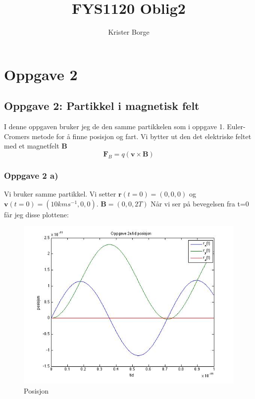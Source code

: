 \documentclass[12pt,a4paper,final,leqno]{report}
\author{Krister Borge }
\title{FYS1120 Oblig2}
\begin{document}
\maketitle

\newpage
\chapter*{Oppgave 2}
\section*{Oppgave 2: Partikkel i magnetisk felt}

I denne oppgaven bruker jeg de den samme partikkelen som i oppgave 1. Euler-Cromers metode for å finne posisjon og fart. Vi bytter ut den det elektriske feltet med et magnetfelt \textbf{B} 
\begin{equation}
\mathbf{F}_B=q(\mathbf{v}\times\mathbf{B})
\end{equation}

\subsection*{Oppgave 2 a)}

Vi bruker samme partikkel. Vi setter $\mathbf{r}(t=0)=(0, 0, 0)$ og $\mathbf{v}(t=0)=(10 km s^{-1}, 0, 0 )$. $\mathbf{B}=(0,0,2T)$
Når vi ser på bevegelsen fra t=0 får jeg disse plottene:

\begin{figure}[H]
\caption{Posisjon}
\centering
\includegraphics[width=\textwidth]{oppgave2rt.jpg}
\end{figure}
\end{document}
